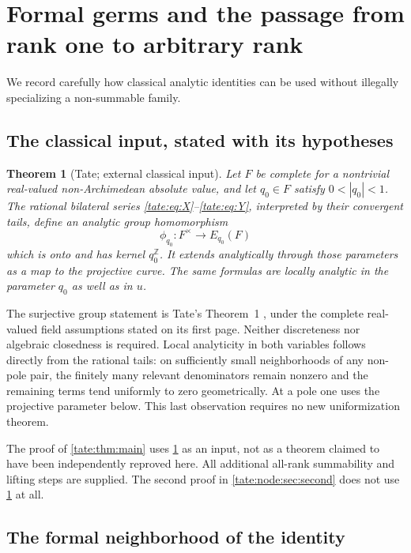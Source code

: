 \documentclass[11pt,letterpaper]{article}
\newtheorem{theorem}{Theorem}[section]
\theoremstyle{definition}
\newcommand{\Z}{\mathbb Z}
\begin{document}
\section{Formal germs and the passage from rank one to arbitrary rank}
\label{tate:sec:germs}

We record carefully how classical analytic identities can be used without
illegally specializing a non-summable family.

\subsection{The classical input, stated with its hypotheses}

\begin{theorem}[Tate; external classical input]\label{tate:thm:classical}
Let $F$ be complete for a nontrivial real-valued non-Archimedean absolute
value, and let $q_0\in F$ satisfy $0<|q_0|<1$. The rational bilateral
series \eqref{tate:eq:X}--\eqref{tate:eq:Y}, interpreted by their convergent tails,
define an analytic group homomorphism
\[
 \phi_{q_0}:F^\times\longrightarrow E_{q_0}(F)
\]
which is onto and has kernel $q_0^\Z$. It extends analytically through
those parameters as a map to the projective curve. The same formulas
are locally analytic in the parameter $q_0$ as well as in $u$.
\end{theorem}

The surjective group statement is Tate's Theorem~1
\cite[author manuscript, p.~6]{Tate}, under the complete real-valued
field assumptions stated on its first page. Neither discreteness nor
algebraic closedness is required. Local analyticity in both variables follows directly from
the rational tails: on sufficiently small neighborhoods of any non-pole
pair, the finitely many relevant denominators remain nonzero and the
remaining terms tend uniformly to zero geometrically. At a pole one
uses the projective parameter below. This last observation requires no
new uniformization theorem.

The proof of \cref{tate:thm:main} uses \cref{tate:thm:classical} as an input,
not as a theorem claimed to have been independently reproved here.
All additional all-rank summability and lifting steps are supplied.
The second proof in \cref{tate:node:sec:second} does not use
\cref{tate:thm:classical} at all.

\subsection{The formal neighborhood of the identity}
\end{document}
